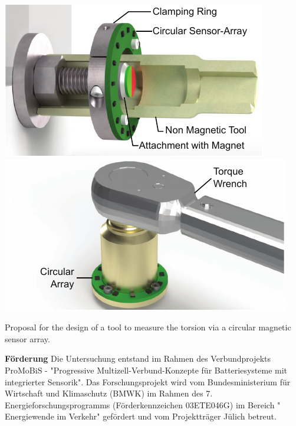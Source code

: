 \begin{multicols}{2}
\begin{mdboxshad}
				\begin{center}
					\begin{figurehere} 
						\includegraphics[width=0.48\linewidth]{IMG/tool3p-crop.pdf}
						\includegraphics[width=0.48\linewidth]{IMG/diffToolp-crop.pdf}
						\caption{Proposal for the design of a tool to measure the torsion via a circular magnetic sensor array.
							\vspace*{-3mm}} 
						\label{fig:vorschlag_werkzeug}
					\end{figurehere} 
				\end{center}
			\end{mdboxshad} 
			\vfill
			\begin{mdboxshad}
				\textbf{Förderung} Die Untersuchung entstand im Rahmen des Verbundprojekts 				ProMoBiS - "Progressive Multizell-Verbund-Konzepte für Batteriesysteme mit integrierter
				Sensorik". Das Forschungsprojekt wird vom Bundesministerium für Wirtschaft
				und Klimaschutz (BMWK) im Rahmen des 7. Energieforschungsprogramms (Förderkennzeichen
				03ETE046G) im Bereich " Energiewende im Verkehr" gefördert und vom Projektträger Jülich
				betreut.
			\end{mdboxshad} 
		\end{multicols}
		
		\vfill
	
